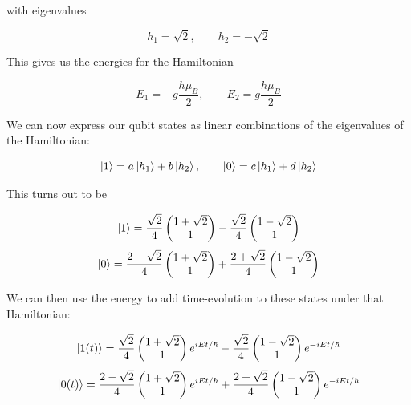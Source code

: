 \documentclass[a4paper,norsk, 10pt]{article}
\begin{document}
with eigenvalues

\begin{equation}
h_1 = \sqrt{2},\qquad h_2  = -\sqrt{2}
\end{equation}

This gives us the energies for the Hamiltonian

\begin{equation}
E_1 = -g\frac{h\mu_B}{2}, \qquad E_2 = g\frac{h\mu_B}{2}
\end{equation}

We can now express our qubit states as linear combinations of the eigenvalues of the Hamiltonian:

\begin{equation}
\ket{1} = a\ket{h_1} + b\ket{h_2}, \qquad \ket{0} = c\ket{h_1} + d\ket{h_2}
\end{equation}

This turns out to be

\begin{equation}
\ket{1} = \frac{\sqrt{2}}{4}
\begin{pmatrix}
1 + \sqrt{2} \\ 1
\end{pmatrix}
-\frac{\sqrt{2}}{4}
\begin{pmatrix}
1 - \sqrt{2} \\ 1
\end{pmatrix}
\end{equation}
\begin{equation}
\ket{0} = \frac{2-\sqrt{2}}{4}
\begin{pmatrix}
1 + \sqrt{2} \\ 1
\end{pmatrix}
+\frac{2+\sqrt{2}}{4}
\begin{pmatrix}
1 - \sqrt{2} \\ 1
\end{pmatrix}
\end{equation}

We can then use the energy to add time-evolution to these states under that Hamiltonian:

\begin{equation}
\ket{1(t)} = \frac{\sqrt{2}}{4}
\begin{pmatrix}
1 + \sqrt{2} \\ 1
\end{pmatrix}
e^{iEt/\hbar}
-\frac{\sqrt{2}}{4}
\begin{pmatrix}
1 - \sqrt{2} \\ 1
\end{pmatrix}
e^{-iEt/\hbar}
\end{equation}
\begin{equation}
\ket{0(t)} = \frac{2-\sqrt{2}}{4}
\begin{pmatrix}
1 + \sqrt{2} \\ 1
\end{pmatrix}
e^{iEt/\hbar}
+\frac{2+\sqrt{2}}{4}
\begin{pmatrix}
1 - \sqrt{2} \\ 1
\end{pmatrix}
e^{-iEt/\hbar}
\end{equation}
\end{document}
